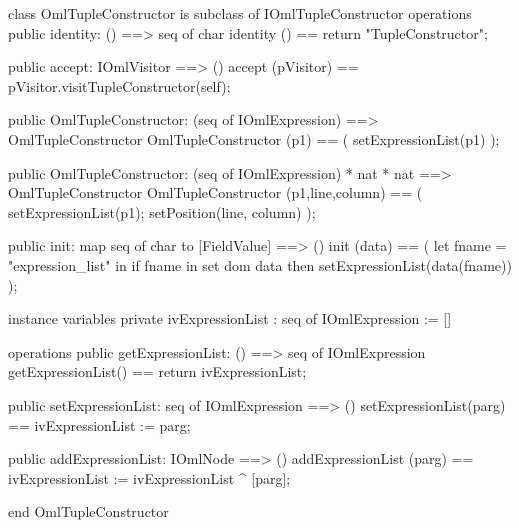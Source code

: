 \begin{vdm_al}
class OmlTupleConstructor is subclass of IOmlTupleConstructor
operations
  public identity: () ==> seq of char
  identity () == return "TupleConstructor";

  public accept: IOmlVisitor ==> ()
  accept (pVisitor) == pVisitor.visitTupleConstructor(self);

  public OmlTupleConstructor:
    (seq of IOmlExpression) ==> OmlTupleConstructor
  OmlTupleConstructor (p1) == 
    ( setExpressionList(p1) );

  public OmlTupleConstructor:
    (seq of IOmlExpression) *
    nat *
    nat ==> OmlTupleConstructor
  OmlTupleConstructor (p1,line,column) == 
    ( setExpressionList(p1);
      setPosition(line, column) );

  public init: map seq of char to [FieldValue] ==> ()
  init (data) ==
    ( let fname = "expression_list" in
        if fname in set dom data
        then setExpressionList(data(fname)) );

instance variables
  private ivExpressionList : seq of IOmlExpression := []

operations
  public getExpressionList: () ==> seq of IOmlExpression
  getExpressionList() == return ivExpressionList;

  public setExpressionList: seq of IOmlExpression ==> ()
  setExpressionList(parg) == ivExpressionList := parg;

  public addExpressionList: IOmlNode ==> ()
  addExpressionList (parg) == ivExpressionList := ivExpressionList ^ [parg];

end OmlTupleConstructor
\end{vdm_al}

